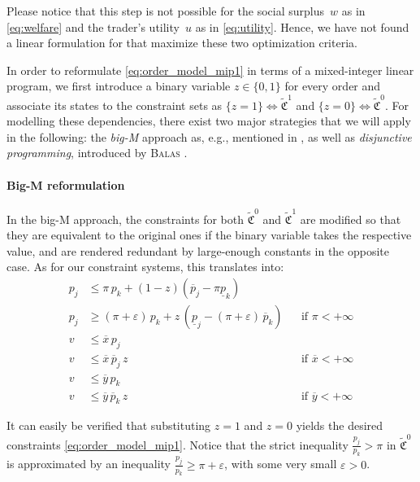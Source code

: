 \documentclass[11pt,parskip=full]{scrartcl}%
\newcommand*{\eg}{e.g., }
\begin{document}
Please notice that this step is not possible for the social surplus~$w$ as in \eqref{eq:welfare} and the trader's utility~$u$ as in \eqref{eq:utility}. 
Hence, we have not found a linear formulation for that maximize these two optimization criteria.

In order to reformulate \eqref{eq:order_model_mip1} in terms of a mixed-integer linear program,
we first introduce a binary variable $ z \in \{0,1\} $ for every order and associate its states to
the constraint sets as $ \{z = 1\} \Leftrightarrow \tilde{\mathfrak{C}}^1 $ and
$ \{z = 0\} \Leftrightarrow \tilde{\mathfrak{C}}^0 $.
For modelling these dependencies, there exist two major strategies that we will apply in the
following:
the \emph{big-M} approach as, \eg mentioned in \cite{BONAMI-ET-AL_2015:indicator-constraints},
as well as \emph{disjunctive programming}, introduced by \textsc{Balas} \cite{BALAS_1979:DP}.

\paragraph{Big-M reformulation}

In the big-M approach, the constraints for both $ \tilde{\mathfrak{C}}^0 $ and
$ \tilde{\mathfrak{C}}^1 $ are modified so that they are equivalent to the original ones if the
binary variable takes the respective value, and are rendered redundant by large-enough constants in
the opposite case.
As for our constraint systems, this translates into:
\begin{subequations}
\begin{align}
  p_j &\le \pi \, p_k + (1-z) (\overline{p}_j - \pi \underline{p}_k) \\
  p_j &\ge (\pi+\varepsilon) \, p_k
    + z \, (\underline{p}_j - (\pi+\varepsilon) \, \overline{p}_k)
    && \text{if } \pi < +\infty \\[1mm]
  v &\le \overline{x} \, p_j \\
  v &\le \overline{x} \, \overline{p}_j \, z
    && \text{if } \overline{x} < +\infty  \\[1mm]
  v &\le \overline{y} \, p_k \\
  v &\le \overline{y} \, \overline{p}_k \, z
    && \text{if } \overline{y} < +\infty
\end{align}
\label{eq:order_model_mip1_bigM}
\end{subequations}

It can easily be verified that substituting $ z=1 $ and $ z=0 $ yields the desired constraints
\eqref{eq:order_model_mip1}.
Notice that the strict inequality $ \frac{p_j}{p_k} > \pi $ in $ \tilde{\mathfrak{C}}^0 $ is
approximated by an inequality $ \frac{p_j}{p_k} \ge \pi + \varepsilon $, with some very small
$ \varepsilon > 0 $.
\end{document}
